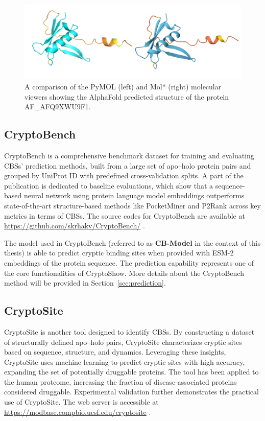 \begin{figure}[ht]
    \centering
    \includegraphics[width=\textwidth]{img/pymol-molstar.png}
    \caption{A comparison of the PyMOL (left) and Mol* (right) molecular viewers showing the AlphaFold predicted structure of the protein AF\_AFQ9XWU9F1.}
    \label{fig:pymol-molstar}
\end{figure}

\subsection{CryptoBench}
\label{sec:cryptobench}

CryptoBench is a comprehensive benchmark dataset for training and evaluating CBSs' prediction methods, built from a large set of apo–holo protein pairs and grouped by UniProt ID with predefined cross-validation splits. A part of the publication is dedicated to baseline evaluations, which show that a sequence-based neural network using protein language model embeddings outperforms state-of-the-art structure-based methods like PocketMiner \cite{meller2023predicting} and P2Rank \cite{krivak2018p2rank} across key metrics in terms of CBSs. The source codes for CryptoBench are available at \url{https://github.com/skrhakv/CryptoBench/} \cite{vskrhak2025cryptobench}.

The model used in CryptoBench (referred to as \textbf{CB-Model} in the context of this thesis) is able to predict cryptic binding sites when provided with ESM-2 embeddings \cite{lin2022language} of the protein sequence. The prediction capability represents one of the core functionalities of CryptoShow. More details about the CryptoBench method will be provided in Section~\ref{sec:prediction}.

\subsection{CryptoSite}
\label{sec:cryptosite}

CryptoSite is another tool designed to identify CBSs. By constructing a dataset of structurally defined apo–holo pairs, CryptoSite characterizes cryptic sites based on sequence, structure, and dynamics. Leveraging these insights, CryptoSite uses machine learning to predict cryptic sites with high accuracy, expanding the set of potentially druggable proteins. The tool has been applied to the human proteome, increasing the fraction of disease-associated proteins considered druggable. Experimental validation further demonstrates the practical use of CryptoSite. The web server is accessible at \url{https://modbase.compbio.ucsf.edu/cryptosite} \cite{cimermancic2016cryptosite}.

